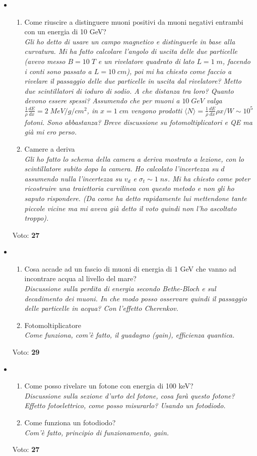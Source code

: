 \documentclass[../main.tex]{subfiles}
\begin{document}
\begin{itemize}
\item \begin{enumerate}
    \item Come riuscire a distinguere muoni positivi da muoni negativi entrambi con un energia di 10 GeV?\\
    \textit{Gli ho detto di usare un campo magnetico e distinguerle in base alla curvatura. Mi ha fatto calcolare l'angolo di uscita delle due particelle (avevo messo $B=10\;T$ e un rivelatore quadrato di lato $L=1\;m$, facendo i conti sono passato a $L=10\;cm$), poi mi ha chiesto come faccio a rivelare il passaggio delle due particelle in uscita dal rivelatore? Metto due scintillatori di ioduro di sodio. A che distanza tra loro? Quanto devono essere spessi? Assumendo che per muoni a $10\;GeV$ valga $\frac{1}{\rho}\frac{dE}{dx}=2\;MeV/g/cm^2$, in $x=1\;cm$ vengono prodotti $\langle N \rangle=\frac{1}{\rho}\frac{dE}{dx}\rho x/W\sim10^5$ fotoni. Sono abbastanza? Breve discussione su fotomoltiplicatori e QE ma già mi ero perso.}
    \item Camere a deriva\\
    \textit{Gli ho fatto lo schema della camera a deriva mostrato a lezione, con lo scintillatore subito dopo la camera. Ho calcolato l'incertezza su $d$ assumendo nulla l'incertezza su $v_d$ e $\sigma_t\sim1\;ns$. Mi ha chiesto come poter ricostruire una traiettoria curvilinea con questo metodo e non gli ho saputo rispondere. (Da come ha detto rapidamente lui mettendone tante piccole vicine ma mi aveva già detto il voto quindi non l'ho ascoltato troppo).}
\end{enumerate}
Voto: {\bf 27}
\item \begin{enumerate}
    \item Cosa accade ad un fascio di muoni di energia di 1 GeV che vanno ad incontrare acqua al livello del mare?\\
    \textit{Discussione sulla perdita di energia secondo Bethe-Bloch e sul decadimento dei muoni. In che modo posso osservare quindi il passaggio delle particelle in acqua? Con l'effetto Cherenkov.}
    \item Fotomoltiplicatore\\
    \textit{Come funziona, com'è fatto, il guadagno (\textit{gain}), efficienza quantica.}
\end{enumerate}
Voto: {\bf 29}
\item \begin{enumerate}
    \item Come posso rivelare un fotone con energia di 100 keV?\\
    \textit{Discussione sulla sezione d'urto del fotone, cosa farà questo fotone? Effetto fotoelettrico, come posso misurarlo? Usando un fotodiodo.}
    \item Come funziona un fotodiodo?\\
    \textit{Com'è fatto, principio di funzionamento, gain.}
\end{enumerate}
Voto: {\bf 27}
\end{itemize}
\end{document}
